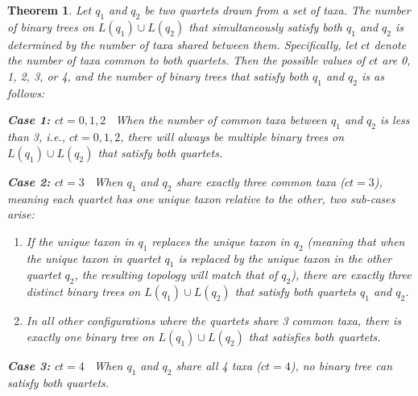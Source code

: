 \documentclass[10pt,a4paper]{article}
\newtheorem{theorem}{Theorem}[section]
\begin{document}
\begin{theorem} 
\label{thm:conflict}
Let $q_1$ and $q_2$ be two quartets drawn from a set of taxa. The number of binary trees on $L(q_1) \cup L(q_2)$ that simultaneously satisfy both $q_1$ and $q_2$ is determined by the number of taxa shared between them. Specifically, let $ct$ denote the number of taxa common to both quartets. Then the possible values of $ct$ are 0, 1, 2, 3, or 4, and the number of binary trees that satisfy both $q_1$ and $q_2$ is as follows: 


\textbf{Case 1: $ct = 0, 1, 2$} \ When the number of common taxa between $q_1$ and $q_2$ is less than 3, i.e., $ct = 0, 1, 2$, there will always be multiple binary trees on $L(q_1) \cup L(q_2)$ that satisfy both quartets.

\textbf{Case 2: $ct = 3$} \ When $q_1$ and $q_2$ share exactly three common taxa ($ct = 3$), meaning each quartet has one unique taxon relative to the other, two sub-cases arise: 
    \begin{enumerate} 
        \item If the unique taxon in $q_1$ replaces the unique taxon in $q_2$ (meaning that when the unique taxon in quartet $q_1$ is replaced by the unique taxon in the other quartet $q_2$, the resulting topology will match that of $q_2$), there are exactly three distinct binary trees on $L(q_1) \cup L(q_2)$ that satisfy both quartets $q_1$ and $q_2$.
        \item In all other configurations where the quartets share 3 common taxa, there is exactly one binary tree on $L(q_1) \cup L(q_2)$ that satisfies both quartets. 
    \end{enumerate}

\textbf{Case 3: $ct = 4$} \ When $q_1$ and $q_2$ share all 4 taxa ($ct = 4$), no binary tree can satisfy both quartets. %
\end{theorem}
\end{document}

